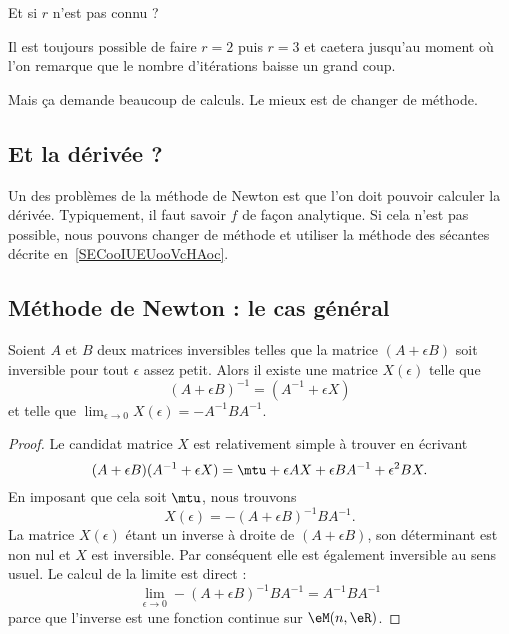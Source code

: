 Et si \( r\) n'est pas connu ?

Il est toujours possible de faire \( r=2\) puis \( r=3\) et caetera jusqu'au moment où l'on remarque que le nombre d'itérations baisse un grand coup.

Mais ça demande beaucoup de calculs.  Le mieux est de changer de méthode.

\subsection{Et la dérivée ?}

Un des problèmes de la méthode de Newton est que l'on doit pouvoir calculer la dérivée. Typiquement, il faut savoir \( f\) de façon analytique. Si cela n'est pas possible, nous pouvons changer de méthode et utiliser la méthode des sécantes décrite en~\ref{SECooIUEUooVcHAoc}.


\subsection{Méthode de Newton : le cas général}

\begin{lemma}       \label{LemXdObnV}
	Soient \( A\) et \( B\) deux matrices inversibles telles que la matrice \( (A+\epsilon B)\) soit inversible pour tout \( \epsilon\) assez petit. Alors il existe une matrice \( X(\epsilon)\) telle que
	\begin{equation}
		(A+\epsilon B)^{-1}=(A^{-1}+\epsilon X)
	\end{equation}
	et telle que \( \lim_{\epsilon\to 0}X(\epsilon)=-A^{-1} BA^{-1}\).
\end{lemma}

\begin{proof}
	Le candidat matrice \( X\) est relativement simple à trouver en écrivant
	\begin{equation}
		(A+\epsilon B)(A^{-1}+\epsilon X)=\mtu+\epsilon AX+\epsilon BA^{-1}+\epsilon^2BX.
	\end{equation}
	En imposant que cela soit \( \mtu\), nous trouvons
	\begin{equation}
		X(\epsilon)=-(A+\epsilon B)^{-1} BA^{-1}.
	\end{equation}
	La matrice \( X(\epsilon)\) étant un inverse à droite de \( (A+\epsilon B)\), son déterminant est non nul et \( X\) est inversible. Par conséquent elle est également inversible au sens usuel. Le calcul de la limite est direct :
	\begin{equation}
		\lim_{\epsilon\to 0}-(A+\epsilon B)^{-1} BA^{-1}=A^{-1} BA^{-1}
	\end{equation}
	parce que l'inverse est une fonction continue sur \( \eM(n,\eR)\).
\end{proof}

